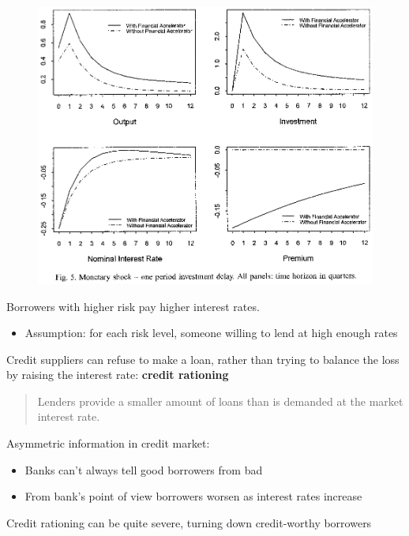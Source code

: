\documentclass{beamer}
\begin{document}
\begin{frame}
 \begin{figure}
   \includegraphics[scale=.8]{bernanke3.eps}
 \end{figure}  
\end{frame}

\begin{frame}
Borrowers with higher risk pay higher interest rates.
\begin{itemize}
  \item Assumption: for each risk level, someone willing to lend at high enough rates  
\end{itemize}
\medskip
 Credit suppliers can refuse to make a loan, rather than trying to balance the loss by raising the interest rate: \textbf{credit rationing}
\begin{quote}
  Lenders provide a smaller amount of loans than is demanded at the market interest rate.
\end{quote}
\end{frame}

\begin{frame}
 Asymmetric information in credit market:
\begin{itemize}
  \item Banks can't always tell good borrowers from bad
  \item From bank's point of view borrowers worsen as interest rates increase
\end{itemize}
  \medskip
  Credit rationing can be quite severe, turning down credit-worthy borrowers
\end{frame}
\end{document}

